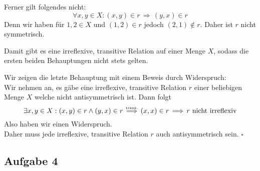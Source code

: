 \documentclass[a4paper,graphics,11pt]{article}
\newcommand{\aufgabe}[1]{\subsection*{Aufgabe #1}}
\newcommand{\up}[2]{\mathrel{\overset{\makebox[0pt]{\mbox{\normalfont\tiny #2}}}{#1}}}
\begin{document}
Ferner gilt folgendes nicht:
$$
	\forall x,y \in X : (x,y) \in r \,\Longrightarrow\, (y,x) \in r
$$
Denn wir haben für $1, 2 \in X$ und $(1,2) \in r$ jedoch $(2,1) \notin r $. Daher ist $r$ nicht symmetrisch.

Damit gibt es eine irreflexive, transitive Relation auf einer Menge $X$, sodass die ersten beiden Behauptungen
nicht stets gelten.

Wir zeigen die letzte Behauptung mit einem Beweis durch Widerspruch: \\

Wir nehmen an, es gäbe eine irreflexive, transitive Relation $r$ einer beliebigen Menge $X$ welche nicht antisymmetrisch ist. Dann folgt
$$
	\exists x,y \in X : (x,y) \in r \land (y,x) \in r
	\up{\,\Longrightarrow\,}{trans.} (x,x) \in r \,\Longrightarrow\, r\ \text{nicht irreflexiv}
$$
Also haben wir einen Widerspruch.\\
Daher muss jede irreflexive, transitive Relation $r$ auch antisymmetrisch sein.
\hfill$\square$
\\

\aufgabe{4}
\end{document}
